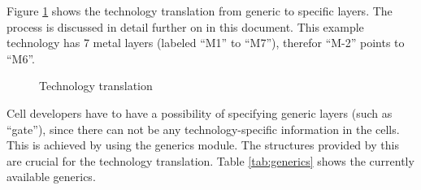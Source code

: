 Figure \ref{fig:techtranslation} shows the technology translation from generic to specific layers. The process is discussed in detail further on in this document.
This example technology has 7 metal layers (labeled \enquote{M1} to \enquote{M7}), therefor \enquote{M-2} points to \enquote{M6}.
\begin{figure}[htb]
    \centering
    \caption{Technology translation}
    \label{fig:techtranslation}
\end{figure}
Cell developers have to have a possibility of specifying generic layers (such as \enquote{gate}), since there can not be any technology-specific information in the
cells. This is achieved by using the generics module. The structures provided by this are crucial for the technology translation. Table \ref{tab:generics} shows the
currently available generics.


